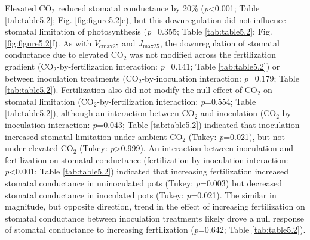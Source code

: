 Elevated CO$_2$ reduced stomatal conductance by 20\% (\textit{p}<0.001; Table \ref{tab:table5.2}; Fig. \ref{fig:figure5.2}e), but this downregulation did not influence stomatal limitation of photosynthesis (\textit{p}=0.355; Table \ref{tab:table5.2}; Fig. \ref{fig:figure5.2}f). As with $V_\mathrm{cmax25}$ and $J_\mathrm{max25}$, the downregulation of stomatal conductance due to elevated CO$_2$ was not modified across the fertilization gradient (CO$_2$-by-fertilization interaction: \textit{p}=0.141; Table \ref{tab:table5.2}) or between inoculation treatments (CO$_2$-by-inoculation interaction: \textit{p}=0.179; Table \ref{tab:table5.2}). Fertilization also did not modify the null effect of CO$_2$ on stomatal limitation (CO$_2$-by-fertilization interaction: \textit{p}=0.554; Table \ref{tab:table5.2}), although an interaction between CO$_2$ and inoculation (CO$_2$-by-inoculation interaction: \textit{p}=0.043; Table \ref{tab:table5.2}) indicated that inoculation increased stomatal limitation under ambient CO$_2$ (Tukey: \textit{p}=0.021), but not under elevated CO$_2$ (Tukey: \textit{p}>0.999). An interaction between inoculation and fertilization on stomatal conductance (fertilization-by-inoculation interaction: \textit{p}<0.001; Table \ref{tab:table5.2}) indicated that increasing fertilization increased stomatal conductance in uninoculated pots (Tukey: \textit{p}=0.003) but decreased stomatal conductance in inoculated pots (Tukey: \textit{p}=0.021). The similar in magnitude, but opposite direction, trend in the effect of increasing fertilization on stomatal conductance between inoculation treatments likely drove a null response of stomatal conductance to increasing fertilization (\textit{p}=0.642; Table \ref{tab:table5.2}).

